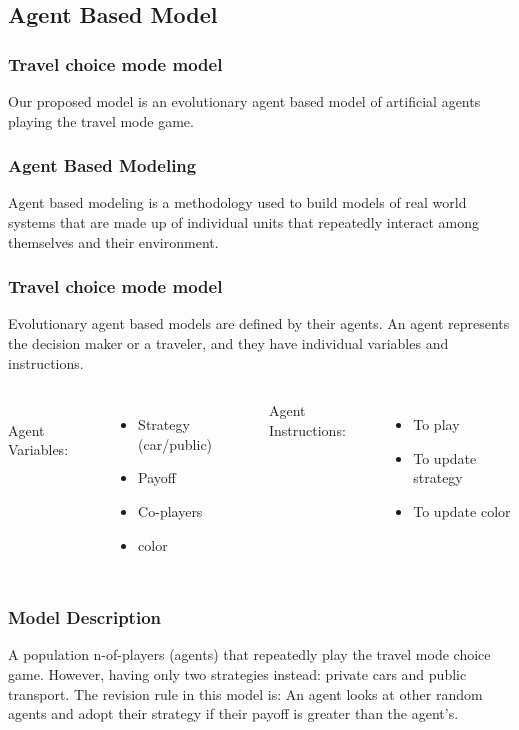 \documentclass[aspectratio=169]{beamer}
\begin{document}
\subsection{Agent Based Model}
\begin{frame}
	\frametitle{Travel choice mode model}
	Our proposed model is an evolutionary \alert{agent based model} of artificial agents playing the travel mode game.
\end{frame}
\begin{frame}
	\frametitle{Agent Based Modeling}
	Agent based modeling is a methodology used to build models of real world systems that are made up of individual units that repeatedly interact among themselves and their environment.
\end{frame}
\begin{frame}
	\frametitle{Travel choice mode model}
	Evolutionary agent based models are defined by their agents. An agent represents the decision maker or a traveler, and they have individual variables and instructions.\\

	    \begin{columns}[c]
  \column{2in}  %
 \\
   Agent Variables:
	\begin{itemize}
	
	
	\item<1-> Strategy (car/public)
  \item<2-> Payoff
  \item<3-> Co-players
  \item<4-> color
  \end{itemize}
  \column{2in}
  Agent Instructions:
  \begin{itemize}
  
  
  \item<1-> To play
  \item<2-> To update strategy
  \item<3-> To update color
  \end{itemize}
 \end{columns}
 \end{frame}
 
\begin{frame}
\frametitle{Model Description}
A population n-of-players (agents) that repeatedly play the travel mode choice game. However, having only two strategies instead: private cars and public transport.
The revision rule in this model is: An agent looks at other random agents and adopt their strategy if their payoff is greater than the agent's.
\end{frame}
  
\end{document}
